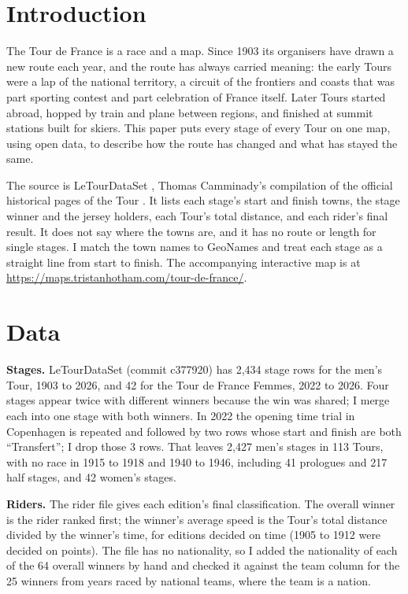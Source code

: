 \documentclass[11pt,a4paper]{article}
\begin{document}
\section{Introduction}
The Tour de France is a race and a map. Since 1903 its organisers have drawn a new route each year, and the route has always carried meaning: the early Tours were a lap of the national territory, a circuit of the frontiers and coasts that was part sporting contest and part celebration of France itself. Later Tours started abroad, hopped by train and plane between regions, and finished at summit stations built for skiers. This paper puts every stage of every Tour on one map, using open data, to describe how the route has changed and what has stayed the same.

The source is LeTourDataSet \citep{ltd}, Thomas Camminady's compilation of the official historical pages of the Tour \citep{letour}. It lists each stage's start and finish towns, the stage winner and the jersey holders, each Tour's total distance, and each rider's final result. It does not say where the towns are, and it has no route or length for single stages. I match the town names to GeoNames \citep{geonames} and treat each stage as a straight line from start to finish. The accompanying interactive map is at \url{https://maps.tristanhotham.com/tour-de-france/}.

\section{Data}
\textbf{Stages.} LeTourDataSet (commit c377920) has 2,434 stage rows for the men's Tour, 1903 to 2026, and 42 for the Tour de France Femmes, 2022 to 2026. Four stages appear twice with different winners because the win was shared; I merge each into one stage with both winners. In 2022 the opening time trial in Copenhagen is repeated and followed by two rows whose start and finish are both ``Transfert''; I drop those 3 rows. That leaves 2,427 men's stages in 113 Tours, with no race in 1915 to 1918 and 1940 to 1946, including 41 prologues and 217 half stages, and 42 women's stages.

\textbf{Riders.} The rider file gives each edition's final classification. The overall winner is the rider ranked first; the winner's average speed is the Tour's total distance divided by the winner's time, for editions decided on time (1905 to 1912 were decided on points). The file has no nationality, so I added the nationality of each of the 64 overall winners by hand and checked it against the team column for the 25 winners from years raced by national teams, where the team is a nation.
\end{document}
